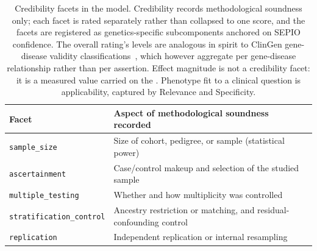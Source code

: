 \begin{table}[H]
    \centering
    \caption{Credibility facets in the \GeneticEvidence{} model.
    Credibility records methodological soundness only; each facet is
    rated separately rather than collapsed to one score, and the facets
    are registered as genetics-specific subcomponents anchored on SEPIO
    confidence. The overall rating's levels are
    analogous in spirit to ClinGen gene-disease validity
    classifications~\cite{clingen2018}, which however aggregate per
    gene-disease relationship rather than per assertion. Effect
    magnitude is not a credibility facet: it is a measured value carried
    on the \GeneticEvidenceVariable{}. Phenotype fit to a clinical
    question is applicability, captured by Relevance and Specificity.}
    \label{tab:credibility-facets}
    \small
    \begin{tabularx}{\linewidth}{@{}lX@{}}
\toprule
Facet & Aspect of methodological soundness recorded \\
\midrule
\texttt{sample\_size}            & Size of cohort, pedigree, or sample (statistical power) \\
\texttt{ascertainment}           & Case/control makeup and selection of the studied sample \\
\texttt{multiple\_testing}       & Whether and how multiplicity was controlled \\
\texttt{stratification\_control} & Ancestry restriction or matching, and residual-confounding control \\
\texttt{replication}             & Independent replication or internal resampling \\
\bottomrule
    \end{tabularx}
\end{table}


